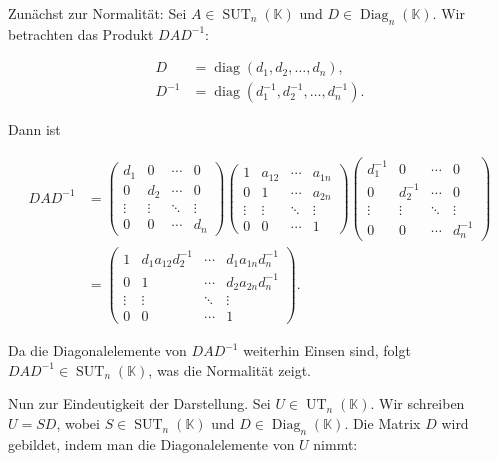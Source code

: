 \documentclass[11pt,a4paper]{article}
\begin{document}
Zunächst zur Normalität: Sei $A \in \operatorname{SUT}_n(\mathbb{K})$ und $D \in \operatorname{Diag}_n(\mathbb{K})$. Wir betrachten das Produkt $DAD^{-1}$:

\begin{align*}
D &= \operatorname{diag}(d_1, d_2, \ldots, d_n), \\
D^{-1} &= \operatorname{diag}(d_1^{-1}, d_2^{-1}, \ldots, d_n^{-1}).
\end{align*}

Dann ist

\begin{align*}
DAD^{-1} &= \begin{pmatrix}
d_1 & 0 & \cdots & 0 \\
0 & d_2 & \cdots & 0 \\
\vdots & \vdots & \ddots & \vdots \\
0 & 0 & \cdots & d_n
\end{pmatrix}
\begin{pmatrix}
1 & a_{12} & \cdots & a_{1n} \\
0 & 1 & \cdots & a_{2n} \\
\vdots & \vdots & \ddots & \vdots \\
0 & 0 & \cdots & 1
\end{pmatrix}
\begin{pmatrix}
d_1^{-1} & 0 & \cdots & 0 \\
0 & d_2^{-1} & \cdots & 0 \\
\vdots & \vdots & \ddots & \vdots \\
0 & 0 & \cdots & d_n^{-1}
\end{pmatrix} \\
&= \begin{pmatrix}
1 & d_1 a_{12} d_2^{-1} & \cdots & d_1 a_{1n} d_n^{-1} \\
0 & 1 & \cdots & d_2 a_{2n} d_n^{-1} \\
\vdots & \vdots & \ddots & \vdots \\
0 & 0 & \cdots & 1
\end{pmatrix}.
\end{align*}

Da die Diagonalelemente von $DAD^{-1}$ weiterhin Einsen sind, folgt $DAD^{-1} \in \operatorname{SUT}_n(\mathbb{K})$, was die Normalität zeigt.

Nun zur Eindeutigkeit der Darstellung. Sei $U \in \operatorname{UT}_n(\mathbb{K})$. Wir schreiben $U = SD$, wobei $S \in \operatorname{SUT}_n(\mathbb{K})$ und $D \in \operatorname{Diag}_n(\mathbb{K})$. Die Matrix $D$ wird gebildet, indem man die Diagonalelemente von $U$ nimmt:
\end{document}
